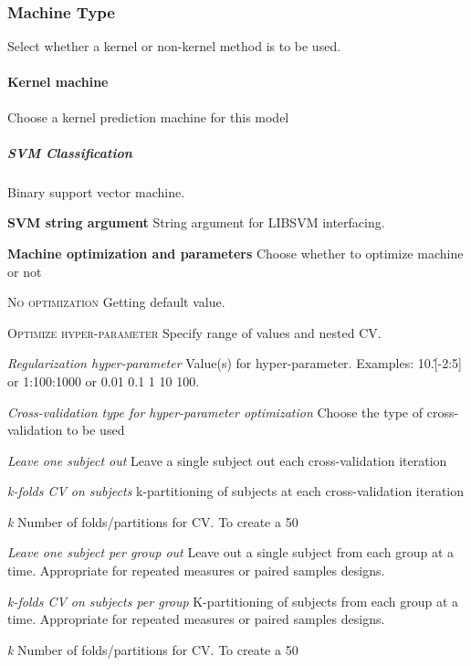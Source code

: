 \subsubsection{Machine Type }
Select whether a kernel or non-kernel method is to be used.


\paragraph{Kernel machine}
Choose a kernel prediction machine for this model


\subparagraph{SVM Classification}
Binary support vector machine.


\textbf{SVM string argument}
String argument for LIBSVM interfacing.


\textbf{Machine optimization and parameters}
Choose whether to optimize machine or not


\textsc{No optimization}
Getting default value.


\textsc{Optimize hyper-parameter}
Specify range of values and nested CV.


\textsl{Regularization hyper-parameter}
Value(s) for hyper-parameter. Examples: 10.\^[-2:5] or 1:100:1000 or 0.01 0.1 1 10 100.


\textsl{Cross-validation type for hyper-parameter optimization}
Choose the type of cross-validation to be used


\textit{Leave one subject out}
Leave a single subject out each cross-validation iteration


\textit{k-folds CV on subjects}
k-partitioning of subjects at each cross-validation iteration


\textit{k}
Number of folds/partitions for CV. To create a 50%


\textit{Leave one subject per group out}
Leave out a single subject from each group at a time. Appropriate for repeated measures or paired samples designs.


\textit{k-folds CV on subjects per group}
K-partitioning of subjects from each group at a time. Appropriate for repeated measures or paired samples designs.


\textit{k}
Number of folds/partitions for CV. To create a 50%


